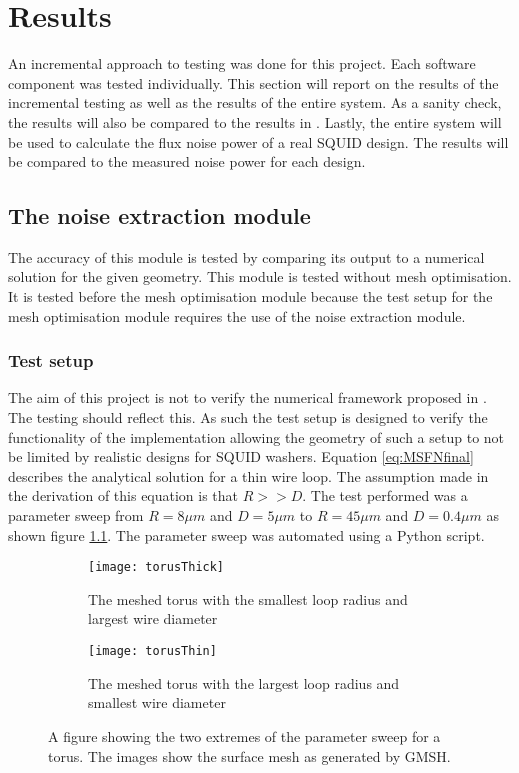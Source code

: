\graphicspath{{results/fig/}}

\chapter{Results}
\label{chap:results}
An incremental approach to testing was done for this project. Each software component was tested individually. This section will report on the results of the incremental testing as well as the results of the entire system. As a sanity check, the results will also be compared to the results in \cite{fluxNoiseSquidsStevenAnton}. Lastly, the entire system will be used to calculate the flux noise power of a real SQUID design. The results will be compared to the measured noise power for each design. 
\section{The noise extraction module}
The accuracy of this module is tested by comparing its output to a numerical solution for the given geometry. This module is tested without mesh optimisation. It is tested before the mesh optimisation module because the test setup for the mesh optimisation module requires the use of the noise extraction module.
\subsection{Test setup}
The aim of this project is not to verify the numerical framework proposed in \cite{fluxNoiseSquidsStevenAnton}. The testing should reflect this. As such the test setup is designed to verify the functionality of the implementation allowing the geometry of such a setup to not be limited by realistic designs for SQUID washers. Equation \ref{eq:MSFNfinal} describes the analytical solution for a thin wire loop. The assumption made in the derivation of this equation is that $R >> D$. The test performed was a parameter sweep from $R = \si{8}{\mu m}$ and $D = \si{5}{\mu m}$ to $R = \si{45}{\mu m}$ and $D = \si{0.4}{\mu m}$ as shown figure \ref{fig:meshedTorus}. The parameter sweep was automated using a Python script.

\begin{figure}[h]
    \centering
    \begin{subfigure}[b]{0.45\textwidth}
        \centering
        \texttt{[image: torusThick]}
        \caption{The meshed torus with the smallest loop radius and largest wire diameter}
    \end{subfigure}
    \hfill
    \begin{subfigure}[b]{0.45\textwidth}
        \centering
        \texttt{[image: torusThin]}
        \caption{The meshed torus with the largest loop radius and smallest wire diameter}
    \end{subfigure}
    \caption{A figure showing the two extremes of the parameter sweep for a torus. The images show the surface mesh as generated by GMSH.}
    \label{fig:meshedTorus}
\end{figure}
